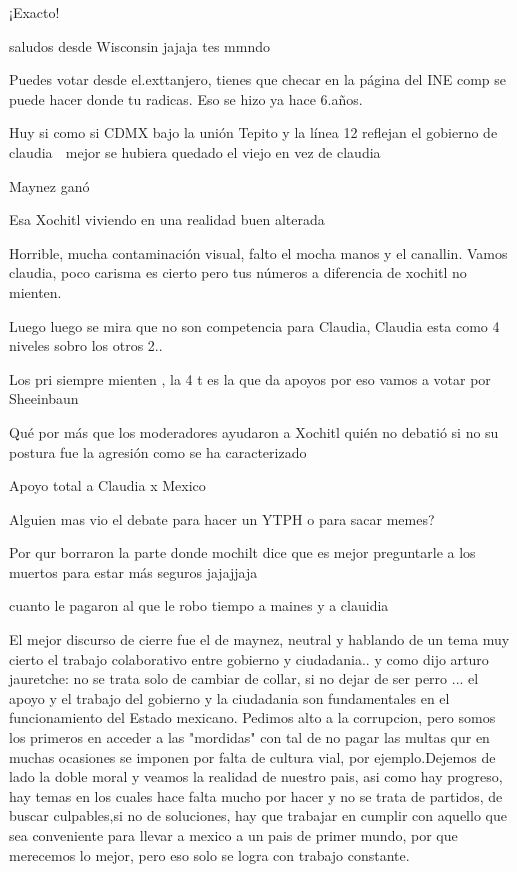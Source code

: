 ¡Exacto!

saludos desde Wisconsin jajaja tes mmndo

Puedes votar desde el.exttanjero, tienes que checar en la página del INE comp se puede hacer donde tu radicas. Eso se hizo ya hace 6.años.

Huy si como si CDMX bajo la unión Tepito y la línea 12 reflejan el gobierno de claudia 🤡 mejor se hubiera quedado el viejo en vez de claudia

Maynez ganó

Esa Xochitl viviendo en una realidad buen alterada

Horrible, mucha contaminación visual, falto el mocha manos y el canallin. Vamos claudia, poco carisma es cierto pero tus números a diferencia de xochitl no mienten.

Luego luego se mira que no son competencia para Claudia, Claudia esta como 4 niveles sobro los otros 2..

Los pri siempre mienten ,  la 4 t es la que da apoyos  por eso vamos a votar por Sheeinbaun

Qué por más que los moderadores ayudaron a Xochitl quién no debatió si no su postura fue la agresión como se ha caracterizado

Apoyo total a Claudia x Mexico

Alguien mas vio el debate para hacer un YTPH o para sacar memes?

Por qur borraron la parte donde mochilt dice que es mejor preguntarle a los muertos para estar más seguros jajajjaja

cuanto le pagaron al que le robo tiempo a maines y a clauidia

El mejor discurso de cierre fue el de maynez, neutral y hablando de un tema muy cierto el trabajo colaborativo entre gobierno y ciudadania.. y como dijo arturo jauretche: no se trata solo de cambiar de collar, si no dejar de ser perro ... el apoyo y el trabajo del gobierno y la ciudadania son fundamentales en el funcionamiento del Estado mexicano.
Pedimos alto a la corrupcion, pero somos los primeros en acceder a las "mordidas" con tal de no pagar las multas qur en muchas ocasiones se imponen por falta de cultura vial, por ejemplo.Dejemos de lado la doble moral y veamos la realidad de nuestro pais, asi como hay progreso, hay temas en los cuales hace falta mucho por hacer y no se trata de partidos, de buscar culpables,si no de soluciones, hay que trabajar en cumplir con  aquello que sea conveniente para llevar a mexico a un pais de primer mundo, por que merecemos lo mejor, pero eso solo se logra con trabajo constante.

